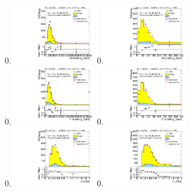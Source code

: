 \begin{figure}[htbp!]
\begin{center}
0.\includegraphics[width=0.33\textwidth, angle=270]{./figures/boosted/Control/Moriond_ThreeTag_Control_leadHCand_trk0_Pt.pdf}
0.\includegraphics[width=0.33\textwidth, angle=270]{./figures/boosted/Control/Moriond_ThreeTag_Control_leadHCand_trk1_Pt.pdf}\\
0.\includegraphics[width=0.33\textwidth, angle=270]{./figures/boosted/Control/Moriond_ThreeTag_Control_sublHCand_trk0_Pt.pdf}
0.\includegraphics[width=0.33\textwidth, angle=270]{./figures/boosted/Control/Moriond_ThreeTag_Control_sublHCand_trk1_Pt.pdf}\\
0.\includegraphics[width=0.33\textwidth, angle=270]{./figures/boosted/Control/Moriond_ThreeTag_Control_leadHCand_trk_dr.pdf}
0.\includegraphics[width=0.33\textwidth, angle=270]{./figures/boosted/Control/Moriond_ThreeTag_Control_sublHCand_trk_dr.pdf}

\end{center}
\end{figure}
